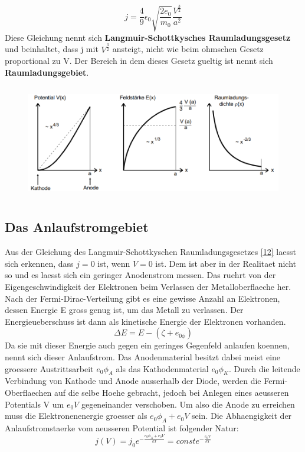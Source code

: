 \begin{equation}
    j=\frac{4}{9}\epsilon_0\sqrt{\frac{2e_0}{m_0}}\frac{V^{\frac{3}{2}}}{a^2} \label{12}
\end{equation}
Diese Gleichung nennt sich \textbf{Langmuir-Schottkysches Raumladungsgesetz} und beinhaltet, dass j mit $V^{\frac{3}{2}}$ ansteigt, nicht wie beim ohmschen Gesetz proportional zu V. Der Bereich in dem dieses Gesetz gueltig ist nennt sich \textbf{Raumladungsgebiet}.
\begin{figure}[H]
    \centering
    \captionsetup{justification=centering}
    \includegraphics[height=5cm]{"Langmuir_emission.png"}
    \label{Fig:Langmuir}
\end{figure}
\subsection{Das Anlaufstromgebiet}
Aus der Gleichung des Langmuir-Schottkyschen Raumladungsgesetzes \ref{12} laesst sich erkennen, dass $j=0$ ist, wenn $V=0$ ist. Dem ist aber in der Realitaet nicht so und es laesst sich ein geringer Anodenstrom messen. Das ruehrt von der Eigengeschwindigkeit der Elektronen beim Verlassen der Metalloberflaeche her. Nach der Fermi-Dirac-Verteilung gibt es eine gewisse Anzahl an Elektronen, dessen Energie E gross genug ist, um das Metall zu verlassen. Der Energieueberschuss ist dann als kinetische Energie der Elektronen vorhanden. 
\begin{equation}
    \Delta E= E-(\zeta+e_{0\phi})
\end{equation}
Da sie mit dieser Energie auch gegen ein geringes Gegenfeld anlaufen koennen, nennt sich dieser Anlaufstrom. Das Anodenmaterial besitzt dabei meist eine groessere Austrittsarbeit $e_0\phi_A$ als das Kathodenmaterial $e_0\phi_K$. Durch die leitende Verbindung von Kathode und Anode ausserhalb der Diode, werden die Fermi-Oberflaechen auf die selbe Hoehe gebracht, jedoch bei Anlegen eines aeusseren Potentials V um $e_0V$ gegeneinander verschoben. Um also die Anode zu erreichen muss die Elektronenenergie groesser als $e_0\phi_A+e_0V$ sein. Die Abhaengigkeit der Anlaufstromstaerke vom aeusseren Potential ist folgender Natur:
\begin{equation}
    j(V)=j_0e^{-\frac{e_0\phi_A+e_0V}{kT}}=const e^{-\frac{e_0V}{kT}}
\end{equation} 
